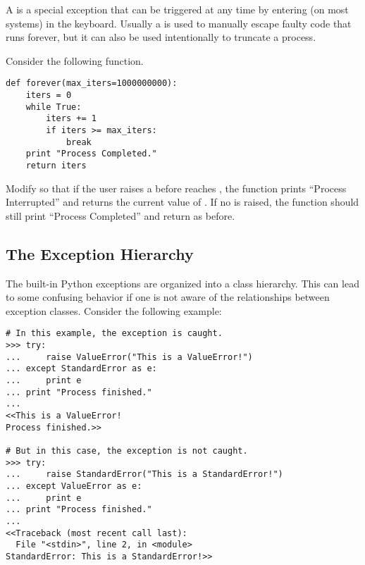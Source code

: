 \begin{problem}
A  is a special exception that can be triggered at any time by entering  (on most systems) in the keyboard.
Usually a  is used to manually escape faulty code that runs forever, but it can also be used intentionally to truncate a process.

Consider the following function.

\begin{lstlisting}
def forever(max_iters=1000000000):
    iters = 0
    while True:
        iters += 1
        if iters >= max_iters:
            break
    print "Process Completed."
    return iters
\end{lstlisting}
Modify  so that if the user raises a  before  reaches , the function prints ``Process Interrupted'' and returns the current value of .
If no  is raised, the function should still print ``Process Completed'' and return  as before.
\end{problem}

\begin{comment}
\subsection*{Chaining Exceptions}
\begin{lstlisting}
>>> try:
>>>     raise ValueError("First Exception")
>>> except ValueError as e:
>>>     raise ZeroDivisionError("Second Exception") from e
\end{lstlisting}
\end{comment}

\subsection*{The Exception Hierarchy}

The built-in Python exceptions are organized into a class hierarchy.
This can lead to some confusing behavior if one is not aware of the relationships between exception classes.
Consider the following example:

\begin{lstlisting}
# In this example, the exception is caught.
>>> try:
...     raise ValueError("This is a ValueError!")
... except StandardError as e:
...     print e
... print "Process finished."
...
<<This is a ValueError!
Process finished.>>

# But in this case, the exception is not caught.
>>> try:
...     raise StandardError("This is a StandardError!")
... except ValueError as e:
...     print e
... print "Process finished."
...
<<Traceback (most recent call last):
  File "<stdin>", line 2, in <module>
StandardError: This is a StandardError!>>
\end{lstlisting}

